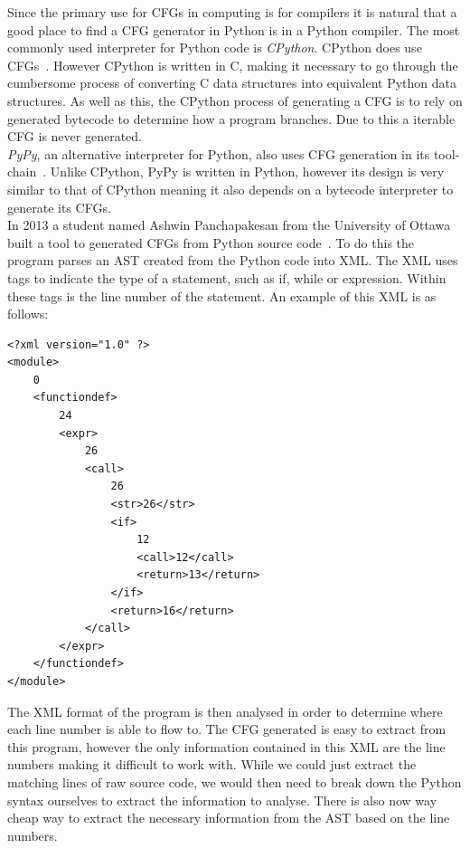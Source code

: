 \documentclass[12pt, titlepage]{article}
\begin{document}
Since the primary use for CFGs in computing is for compilers it is natural that a good place to find a CFG generator in Python is in a Python compiler. The most commonly used interpreter for Python code is \textit{CPython}. CPython does use CFGs~\cite{cpythonCFG}. However CPython is written in C, making it necessary to go through the cumbersome process of converting C data structures into equivalent Python data structures. As well as this, the CPython process of generating a CFG is to rely on generated bytecode to determine how a program branches. Due to this a iterable CFG is never generated. \\
\textit{PyPy}, an alternative interpreter for Python, also uses CFG generation in its tool-chain~\cite{pypyCFG}. Unlike CPython, PyPy is written in Python, however its design is very similar to that of CPython meaning it also depends on a bytecode interpreter to generate its CFGs. \\
In 2013 a student named Ashwin Panchapakesan from the University of Ottawa built a tool to generated CFGs from Python source code~\cite{ashwinCFG}. To do this the program parses an AST created from the Python code into XML. The XML uses tags to indicate the type of a statement, such as if, while or expression. Within these tags is the line number of the statement. An example of this XML is as follows:
\begin{verbatim}
<?xml version="1.0" ?>
<module>
    0
    <functiondef>
        24
        <expr>
            26
            <call>
                26
                <str>26</str>
                <if>
                    12
                    <call>12</call>
                    <return>13</return>
                </if>
                <return>16</return>
            </call>
        </expr>
    </functiondef>
</module>
\end{verbatim}
The XML format of the program is then analysed in order to determine where each line number is able to flow to. The CFG generated is easy to extract from this program, however the only information contained in this XML are the line numbers making it difficult to work with. While we could just extract the matching lines of raw source code, we would then need to break down the Python syntax ourselves to extract the information to analyse. There is also now way cheap way to extract the necessary information from the AST based on the line numbers.
\end{document}
